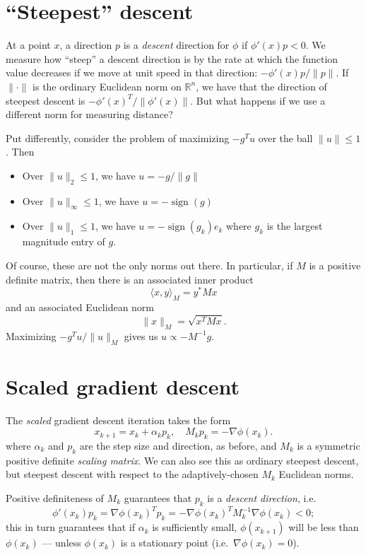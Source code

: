 \documentclass[12pt, leqno]{article} %
\providecommand{\tightlist}{%
  \setlength{\itemsep}{0pt}\setlength{\parskip}{0pt}}
\begin{document}
\section{``Steepest'' descent}

At a point \(x\), a direction \(p\) is a \emph{descent} direction for
\(\phi\) if \(\phi'(x) p < 0\). We measure how ``steep'' a descent
direction is by the rate at which the function value decreases if we
move at unit speed in that direction: \(-\phi'(x) p/\|p\|\). If
\(\|\cdot\|\) is the ordinary Euclidean norm on \(\mathbb{R}^n\), we
have that the direction of steepest descent is
\(-\phi'(x)^T/\|\phi'(x)\|\). But what happens if we use a different
norm for measuring distance?

Put differently, consider the problem of maximizing \(-g^T u\) over the
ball \(\|u\| \leq 1\). Then

\begin{itemize}
\tightlist
\item
  Over \(\|u\|_2 \leq 1\), we have \(u = -g/\|g\|\)
\item
  Over \(\|u\|_\infty \leq 1\), we have \(u = -\operatorname{sign}(g)\)
\item
  Over \(\|u\|_1 \leq 1\), we have \(u = -\operatorname{sign}(g_k) e_k\)
  where \(g_k\) is the largest magnitude entry of \(g\).
\end{itemize}

Of course, these are not the only norms out there. In particular, if
\(M\) is a positive definite matrix, then there is an associated inner
product \[\langle x, y \rangle_M = y^* M x\] and an associated Euclidean
norm \[\|x\|_M = \sqrt{x^T M x}.\] Maximizing \(-g^T u / \|u\|_M\) gives
us \(u \propto -M^{-1} g\).

\section{Scaled gradient descent}

The \emph{scaled} gradient descent iteration takes the form
\[x_{k+1} = x_k + \alpha_k p_k, \quad M_k p_k = -\nabla \phi(x_k).\]
where \(\alpha_k\) and \(p_k\) are the step size and direction, as
before, and \(M_k\) is a symmetric positive definite \emph{scaling
matrix}. We can also see this as ordinary steepest descent, but steepest
descent with respect to the adaptively-chosen \(M_k\) Euclidean norms.

Positive definiteness of \(M_k\) guarantees that \(p_k\) is a
\emph{descent direction}, i.e. \[\phi'(x_k) p_k = \nabla \phi(x_k)^T p_k
  = -\nabla \phi(x_k)^T M_k^{-1} \nabla \phi(x_k) < 0;\] this in turn
guarantees that if \(\alpha_k\) is sufficiently small, \(\phi(x_{k+1})\)
will be less than \(\phi(x_k)\) --- unless \(\phi(x_k)\) is a stationary
point (i.e.~\(\nabla \phi(x_k) = 0\)).
\end{document}
